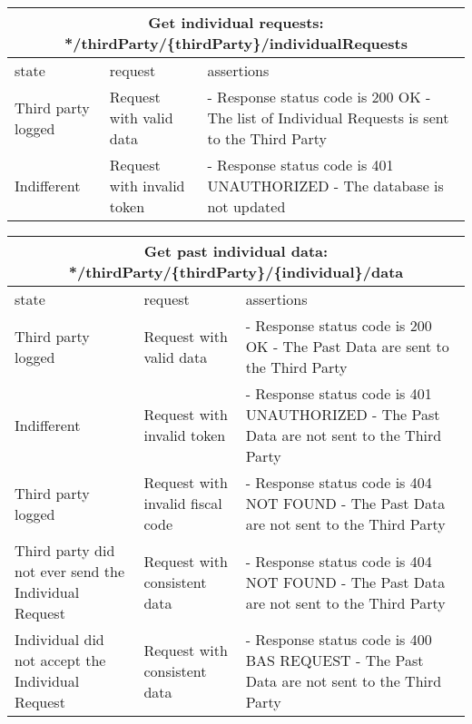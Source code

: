 \begin{center}
	\begin{tabular}{|p{}|p{}|p{}|}
		\hline
		\multicolumn{3}{c}{Get individual requests: */thirdParty/\{thirdParty\}/individualRequests}\\

		\hline
		state & request & assertions \\
		
		\hline
		Third party logged&
		Request with valid data & 
		- Response status code is 200 OK\newline
		- The list of Individual Requests is sent to the Third Party
		\\
		
		\hline
		Indifferent&
		Request with invalid token & 
		- Response status code is 401 UNAUTHORIZED \newline
		- The database is not updated
		\\

	\end{tabular}
\end{center}

\begin{center}
	\begin{tabular}{|p{}|p{}|p{}|}
		\hline
		\multicolumn{3}{c}{Get past individual data: */thirdParty/\{thirdParty\}/\{individual\}/data}\\

		\hline
		state & request & assertions \\
		
		\hline
		Third party logged&
		Request with valid data & 
		- Response status code is 200 OK\newline
		- The Past Data are sent to the Third Party
		\\
		
		\hline
		Indifferent&
		Request with invalid token & 
		- Response status code is 401 UNAUTHORIZED \newline
		- The Past Data are not sent to the Third Party
		\\
		\hline
		Third party logged&
		Request with invalid fiscal code & 
		- Response status code is 404 NOT FOUND\newline
		- The Past Data are not sent to the Third Party
		\\
		\hline
		Third party did not ever send the Individual Request&
		Request with consistent data & 
		- Response status code is 404 NOT FOUND\newline
		- The Past Data are not sent to the Third Party
		\\
		Individual did not accept the Individual Request&
		Request with consistent data & 
		- Response status code is 400 BAS REQUEST\newline
		- The Past Data are not sent to the Third Party
		\\

	\end{tabular}
\end{center}

